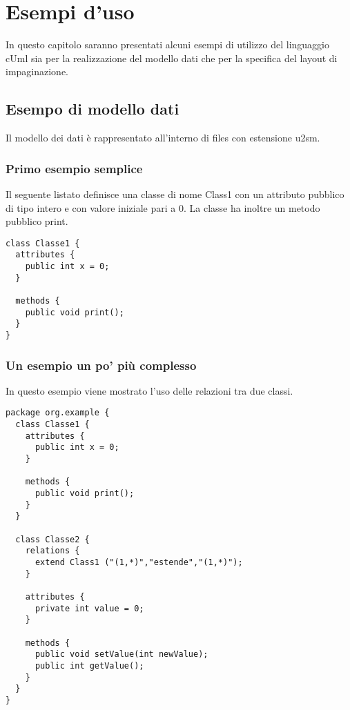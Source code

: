 \chapter{Esempi d'uso}

In questo capitolo saranno presentati alcuni esempi di utilizzo del linguaggio
cUml sia per la realizzazione del modello dati che per la specifica del layout
di impaginazione.

\section{Esempo di modello dati}
Il modello dei dati è rappresentato all'interno di files con estensione u2sm.

\subsection{Primo esempio semplice}
Il seguente listato definisce una classe di nome Class1 con un attributo
pubblico di tipo intero e con valore iniziale pari a 0. La classe ha inoltre un
metodo pubblico print.
\begin{lstlisting}[language=model, caption={Semplice esempio di modello}, style={model}]
class Classe1 {
  attributes {
    public int x = 0;
  }

  methods {
    public void print();
  }
}
\end{lstlisting}

\subsection{Un esempio un po' più complesso}
In questo esempio viene mostrato l'uso delle relazioni tra due classi.

\begin{lstlisting}[language=model, caption={Un esempio un po' più complesso}, style={model}, label=model_complex]
package org.example {
  class Classe1 {
    attributes {
      public int x = 0;
    }

    methods {
      public void print();
    }
  }

  class Classe2 {
    relations {
      extend Class1 ("(1,*)","estende","(1,*)");
    }

    attributes {
      private int value = 0;
    }

    methods {
      public void setValue(int newValue);
      public int getValue();
    }
  }
}
\end{lstlisting}


